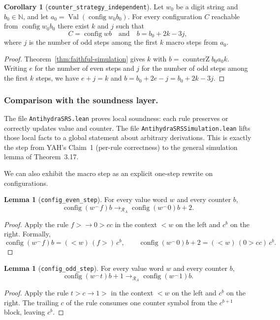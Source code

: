 \documentclass[11pt,a4paper]{article}
\theoremstyle{definition}
\newtheorem{lemma}[definition]{Lemma}
\newtheorem{corollary}[definition]{Corollary}
\newcommand{\lt}{<}
\newcommand{\gt}{>}
\newcommand{\Nat}{\mathbb{N}}
\newcommand{\val}{\operatorname{Val}}
\newcommand{\conc}{{^\frown}}
\newcommand{\config}{\operatorname{config}}
\newcommand{\antihydraSRS}{\mathcal{R}_{A}}
\newcommand{\counterZ}{\operatorname{counterZ}}
\begin{document}
\begin{corollary}[\texttt{counter\_strategy\_independent}]
\label{cor:counter-strategy}
Let $w_0$ be a digit string and $b_0\in\Nat$, and let $a_0=\val(\config{w_0}{b_0})$.
For every configuration $C$ reachable from $\config{w_0}{b_0}$ there
exist $k$ and $j$ such that
\[
  C=\config w b\quad\text{and}\quad
  b=b_0+2k-3j,
\]
where $j$ is the number of odd steps among the first $k$ macro steps
from $a_0$.
\end{corollary}
\begin{proof}
Theorem~\ref{thm:faithful-simulation} gives $k$ with
$b=\counterZ{b_0}{a_0}{k}$.  Writing $e$ for the number of even steps
and $j$ for the number of odd steps among the first $k$ steps, we have
$e+j=k$ and $b=b_0+2e-j=b_0+2k-3j$.
\end{proof}

\subsubsection*{Comparison with the soundness layer.}
The file \texttt{AntihydraSRS.lean} proves local soundness: each rule
preserves or correctly updates value and counter.  The file
\texttt{AntihydraSRSSimulation.lean} lifts those local facts to a global
statement about arbitrary derivations.  This is exactly the step from
YAH's Claim~1 (per-rule correctness) to the general simulation lemma of
Theorem~3.17.

We can also exhibit the macro step as an explicit one-step rewrite on
configurations.

\begin{lemma}[\texttt{config\_even\_step}]
  \label{lem:config-even}
  For every value word $w$ and every counter $b$,
  \[
    \config{(w\conc f)}{b}
    \to_{\antihydraSRS}
    \config{(w\conc 0)}{b+2}.
  \]
\end{lemma}
\begin{proof}
  Apply the rule $f\gt\to0\gt cc$ in the context
  $\lt w$ on the left and $c^{b}$ on the right.  Formally,
  \[
    \config{(w\conc f)}{b}
    =
    (\lt w)\,(f\gt)\,c^{b},
    \qquad
    \config{(w\conc 0)}{b+2}
    =
    (\lt w)\,(0\gt cc)\,c^{b}.
  \]
\end{proof}

\begin{lemma}[\texttt{config\_odd\_step}]
  \label{lem:config-odd}
  For every value word $w$ and every counter $b$,
  \[
    \config{(w\conc t)}{b+1}
    \to_{\antihydraSRS}
    \config{(w\conc 1)}{b}.
  \]
\end{lemma}
\begin{proof}
  Apply the rule $t\gt c\to1\gt$ in the context
  $\lt w$ on the left and $c^{b}$ on the right.  The trailing $c$ of the
  rule consumes one counter symbol from the $c^{b+1}$ block, leaving
  $c^{b}$.
\end{proof}
\end{document}
